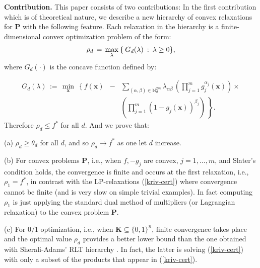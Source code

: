 \documentclass[11pt]{article}
\numberwithin{equation}{section}
\def\x{\mathbf{x}}
\def\N{\mathbb{N}}
\def\K{\mathbf{K}}
\def\P{\mathbf{P}}
\def\blambda{{\boldmath{\lambda}}}
\begin{document}
{\bf Contribution.} This paper consists of two contributions:
In the first contribution which is of theoretical nature, we describe a new hierarchy of convex relaxations for $\P$ with the following 
feature. Each relaxation in the hierarchy is a finite-dimensional convex optimization problem of the form:
\begin{equation}
\label{newhierarchy-def}
\rho_d\,=\,\max_{\blambda}\:\{\:G_d(\lambda)\::\: \blambda\geq0\},
\end{equation}
where $G_d(\cdot)$ is the concave function defined by:

\begin{eqnarray}
\nonumber
G_d(\lambda)\,:=\,\min_\x\:\left\{f(\x)\right.&-&\sum_{(\alpha,\beta)\in\N^{2m}_{d}}\lambda_{\alpha\beta}\,\left(\prod_{j=1}^mg_j^{\alpha_j}(\x)\right)\times\\
&&\left.
\label{def-gedelambda}
\left(\prod_{j=1}^m(1-g_j(\x))^{\beta_j}\right)\:\right\}.\end{eqnarray}
Therefore $\rho_d\leq f^*$ for all $d$. And we prove that:

(a)  $\rho_d\geq\theta_d$ for all $d$, and so $\rho_d\to f^*$ as one let $d$ increase.

(b) For convex problems $\P$, i.e., when $f,-g_j$ are convex, $j=1,\ldots,m$, and Slater's condition holds, the convergence is finite and occurs at the first relaxation,
i.e., $\rho_1=f^*$, in contrast with the LP-relaxations (\ref{kriv-cert}) where convergence cannot be finite (and is very slow on simple trivial examples). In fact computing $\rho_1$ is just applying the standard dual method 
of multipliers (or Lagrangian relaxation) to the convex problem $\P$.

(c) For $0/1$ optimization, i.e., when $\K\subseteq\{0,1\}^n$, finite convergence takes place and the optimal value $\rho_d$ provides a better lower bound than 
the one obtained with Sherali-Adams' RLT hierarchy \cite{SheraliAdams90}. In fact, the latter is solving (\ref{kriv-cert}) with only a subset of the 
products that appear in (\ref{kriv-cert}).%
\end{document}
